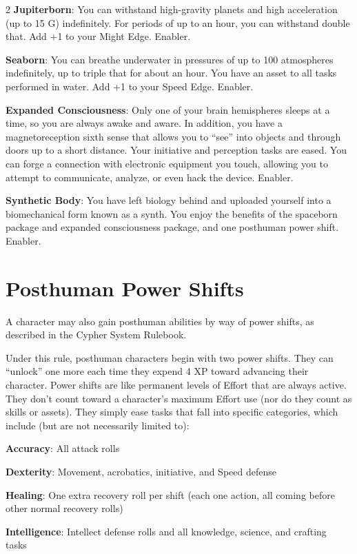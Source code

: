 \begin{multicols}{2}
\textbf{Jupiterborn}: You can withstand high-gravity planets and high acceleration (up to 15 G) indefinitely. For periods of up to an hour, you can withstand double that. Add +1 to your Might Edge. Enabler. 

\textbf{Seaborn}: You can breathe underwater in pressures of up to 100 atmospheres indefinitely, up to triple that for about an hour. You have an asset to all tasks performed in water. Add +1 to your Speed Edge. Enabler. 

\textbf{Expanded Consciousness}: Only one of your brain hemispheres sleeps at a time, so you are always awake and aware. In addition, you have a magnetoreception sixth sense that allows you to “see” into objects and through doors up to a short distance. Your initiative and perception tasks are eased. You can forge a connection with electronic equipment you touch, allowing you to attempt to communicate, analyze, or even hack the device. Enabler. 

\textbf{Synthetic Body}: You have left biology behind and uploaded yourself into a biomechanical form known as a synth. You enjoy the benefits of the spaceborn package and expanded consciousness package, and one posthuman power shift. Enabler.

\section{Posthuman Power Shifts}

A character may also gain posthuman abilities by way of power shifts, as described in the Cypher System Rulebook. 

Under this rule, posthuman characters begin with two power shifts. They can “unlock” one more each time they expend 4 XP toward advancing their character. Power shifts are like permanent levels of Effort that are always active. They don’t count toward a character’s maximum Effort use (nor do they count as skills or assets). They simply ease tasks that fall into specific categories, which include (but are not necessarily limited to): 

\textbf{Accuracy}: All attack rolls 

\textbf{Dexterity}: Movement, acrobatics, initiative, and Speed defense 

\textbf{Healing}: One extra recovery roll per shift (each one action, all coming before other normal recovery rolls) 

\textbf{Intelligence}: Intellect defense rolls and all knowledge, science, and crafting tasks 


\end{multicols}
